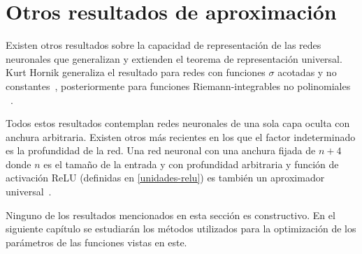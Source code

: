 \section{Otros resultados de aproximación}

Existen otros resultados sobre la capacidad de representación de las redes neuronales que generalizan y extienden el teorema de representación universal. Kurt Hornik generaliza el resultado para redes con funciones $\sigma$ acotadas y no constantes~\cite{hornik1989multilayer}, posteriormente para funciones Riemann-integrables no polinomiales ~\cite{hornik1991approximation}.

Todos estos resultados contemplan redes neuronales de una sola capa oculta con anchura arbitraria. Existen otros más recientes en los que el factor indeterminado es la profundidad de la red. Una red neuronal con una anchura fijada de $n + 4$ donde $n$ es el tamaño de la entrada y con profundidad arbitraria y función de activación ReLU (definidas en \autoref{unidades-relu}) es también un aproximador universal~\cite{lu2017expressive}.

Ninguno de los resultados mencionados en esta sección es constructivo. En el siguiente capítulo se estudiarán los métodos utilizados para la optimización de los parámetros de las funciones vistas en este.
\endinput
